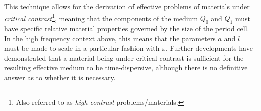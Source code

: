 This technique allows for the derivation of effective problems of materials under \emph{critical contrast}\footnote{Also referred to as \emph{high-contrast} problems/materials.}, meaning that the components of the medium $Q_0$ and $Q_1$ must have specific relative material properties governed by the size of the period cell.
In the high frequency context above, this means that the parameters $a$ and $l$ must be made to scale in a particular fashion with $\varepsilon$.
Further developments  have demonstrated that a material being under critical contrast is sufficient for the resulting effective medium to be time-dispersive, although there is no definitive answer as to whether it is necessary. 